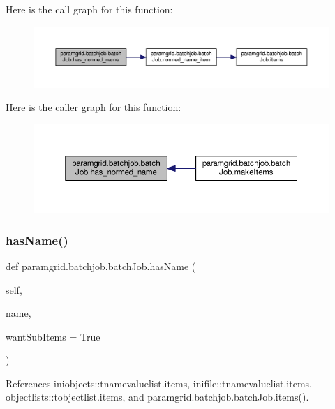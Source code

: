 Here is the call graph for this function\+:
\nopagebreak
\begin{figure}[H]
\begin{center}
\leavevmode
\includegraphics[width=350pt]{classparamgrid_1_1batchjob_1_1batchJob_a6110e6b6926e033a773d799e35e1ba68_cgraph}
\end{center}
\end{figure}
Here is the caller graph for this function\+:
\nopagebreak
\begin{figure}[H]
\begin{center}
\leavevmode
\includegraphics[width=350pt]{classparamgrid_1_1batchjob_1_1batchJob_a6110e6b6926e033a773d799e35e1ba68_icgraph}
\end{center}
\end{figure}
\mbox{\label{classparamgrid_1_1batchjob_1_1batchJob_a51f5136c448e61a252384d376d57796e}} 
\subsubsection{\texorpdfstring{has\+Name()}{hasName()}}
{\footnotesize\ttfamily def paramgrid.\+batchjob.\+batch\+Job.\+has\+Name (\begin{DoxyParamCaption}\item[{}]{self,  }\item[{}]{name,  }\item[{}]{want\+Sub\+Items = {\ttfamily True} }\end{DoxyParamCaption})}



References iniobjects\+::tnamevaluelist.\+items, inifile\+::tnamevaluelist.\+items, objectlists\+::tobjectlist.\+items, and paramgrid.\+batchjob.\+batch\+Job.\+items().

